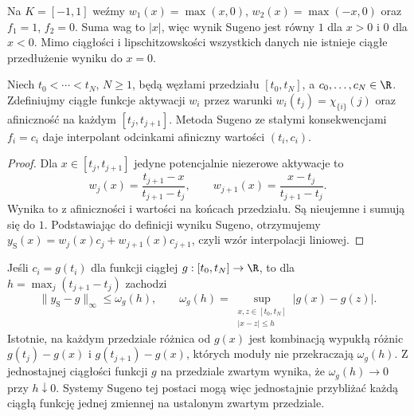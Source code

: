 \begin{przyklad}
\label{ex:ncl-sugeno-zero-activation}
Na $K=[-1,1]$ weźmy
$w_1(x)=\max(x,0)$, $w_2(x)=\max(-x,0)$
oraz $f_1=1$, $f_2=0$. Suma wag to $|x|$,
więc wynik Sugeno jest równy $1$ dla $x>0$
i $0$ dla $x<0$. Mimo ciągłości i lipschitzowskości
wszystkich danych nie istnieje ciągłe przedłużenie
wyniku do $x=0$.
\end{przyklad}

\begin{stwierdzenie}
\label{prop:ncl-sugeno-interpolation}
Niech $t_0<\cdots<t_N$, $N\geq1$, będą węzłami
przedziału $[t_0,t_N]$, a $c_0,\ldots,c_N\in\R$.
Zdefiniujmy ciągłe funkcje aktywacji $w_i$ przez
warunki $w_i(t_j)=\chi_{\{i\}}(j)$ oraz afiniczność
na każdym $[t_j,t_{j+1}]$. Metoda Sugeno ze
stałymi konsekwencjami $f_i=c_i$ daje interpolant
odcinkami afiniczny wartości $(t_i,c_i)$.
\end{stwierdzenie}
\begin{proof}
Dla $x\in[t_j,t_{j+1}]$ jedyne potencjalnie
niezerowe aktywacje to
\[
 w_j(x)=\frac{t_{j+1}-x}{t_{j+1}-t_j},
 \qquad
 w_{j+1}(x)=\frac{x-t_j}{t_{j+1}-t_j}.
\]
Wynika to z afiniczności i wartości na końcach
przedziału. Są nieujemne i sumują się do $1$.
Podstawiając do definicji wyniku Sugeno,
otrzymujemy $y_{\mathrm S}(x)=w_j(x)c_j+w_{j+1}(x)c_{j+1}$,
czyli wzór interpolacji liniowej.
\end{proof}
Jeśli $c_i=g(t_i)$ dla funkcji ciągłej
$g:[t_0,t_N]\to\R$, to dla
$h=\max_j(t_{j+1}-t_j)$ zachodzi
\[
 \|y_{\mathrm S}-g\|_\infty\leq\omega_g(h),\qquad
 \omega_g(h)=\sup_{\substack{x,z\in[t_0,t_N]\\|x-z|\leq h}}
                 |g(x)-g(z)|.
\]
Istotnie, na każdym przedziale różnica od $g(x)$
jest kombinacją wypukłą różnic $g(t_j)-g(x)$
i $g(t_{j+1})-g(x)$, których moduły nie przekraczają
$\omega_g(h)$. Z jednostajnej ciągłości funkcji
$g$ na przedziale zwartym wynika, że
$\omega_g(h)\to0$ przy $h\downarrow0$.
Systemy Sugeno tej postaci mogą więc jednostajnie
przybliżać każdą ciągłą funkcję jednej zmiennej
na ustalonym zwartym przedziale.

